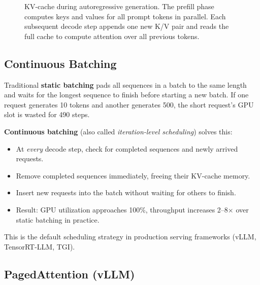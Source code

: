 \begin{figure}[H]
\caption{KV-cache during autoregressive generation.  The prefill phase computes keys
and values for all prompt tokens in parallel.  Each subsequent decode step appends one
new K/V pair and reads the full cache to compute attention over all previous tokens.}
\label{fig:kv_cache}
\end{figure}

\subsection{Continuous Batching}
\label{sec:continuous_batching}

Traditional \textbf{static batching} pads all sequences in a batch to the same length
and waits for the longest sequence to finish before starting a new batch.  If one
request generates 10 tokens and another generates 500, the short request's GPU slot is
wasted for 490 steps.

\textbf{Continuous batching} (also called \emph{iteration-level scheduling}) solves this:
\begin{itemize}
    \item At \emph{every} decode step, check for completed sequences and newly arrived
          requests.
    \item Remove completed sequences immediately, freeing their KV-cache memory.
    \item Insert new requests into the batch without waiting for others to finish.
    \item Result: GPU utilization approaches 100\%, throughput increases 2--8$\times$
          over static batching in practice.
\end{itemize}

This is the default scheduling strategy in production serving frameworks (vLLM,
TensorRT-LLM, TGI).

\subsection{PagedAttention (vLLM)}
\label{sec:paged_attention}

